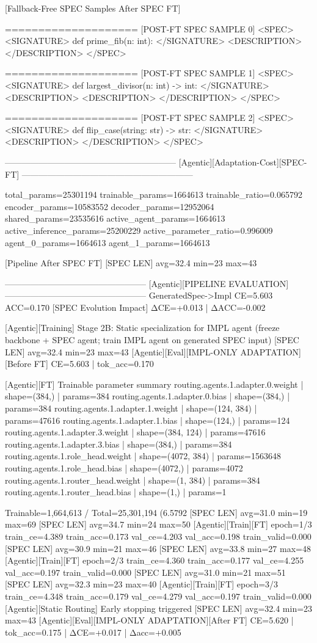 [Fallback-Free SPEC Samples After SPEC FT]

====================
[POST-FT SPEC SAMPLE 0]
<SPEC> <SIGNATURE> def prime_fib(n: int): </SIGNATURE> <DESCRIPTION> </DESCRIPTION> </SPEC>

====================
[POST-FT SPEC SAMPLE 1]
<SPEC> <SIGNATURE> def largest_divisor(n: int) -> int: </SIGNATURE> <DESCRIPTION> <DESCRIPTION> </DESCRIPTION> </SPEC>

====================
[POST-FT SPEC SAMPLE 2]
<SPEC> <SIGNATURE> def flip_case(string: str) -> str: </SIGNATURE> <DESCRIPTION> </DESCRIPTION> </SPEC>

------------------------------------------------------------
[Agentic][Adaptation-Cost][SPEC-FT]
------------------------------------------------------------

total_params=25301194
trainable_params=1664613
trainable_ratio=0.065792
encoder_params=10583552
decoder_params=12952064
shared_params=23535616
active_agent_params=1664613
active_inference_params=25200229
active_parameter_ratio=0.996009
agent_0_params=1664613
agent_1_params=1664613

[Pipeline After SPEC FT]
[SPEC LEN] avg=32.4 min=23 max=43

--------------------------------------------------
[Agentic][PIPELINE EVALUATION]
--------------------------------------------------
GeneratedSpec->Impl  CE=5.603 ACC=0.170
[SPEC Evolution Impact] ΔCE=+0.013 | ΔACC=-0.002

[Agentic][Training] Stage 2B: Static specialization for IMPL agent (freeze backbone + SPEC agent; train IMPL agent on generated SPEC input)
[SPEC LEN] avg=32.4 min=23 max=43
[Agentic][Eval][IMPL-ONLY ADAPTATION][Before FT] CE=5.603 | tok_acc=0.170

[Agentic][FT] Trainable parameter summary
routing.agents.1.adapter.0.weight | shape=(384,) | params=384
routing.agents.1.adapter.0.bias | shape=(384,) | params=384
routing.agents.1.adapter.1.weight | shape=(124, 384) | params=47616
routing.agents.1.adapter.1.bias | shape=(124,) | params=124
routing.agents.1.adapter.3.weight | shape=(384, 124) | params=47616
routing.agents.1.adapter.3.bias | shape=(384,) | params=384
routing.agents.1.role_head.weight | shape=(4072, 384) | params=1563648
routing.agents.1.role_head.bias | shape=(4072,) | params=4072
routing.agents.1.router_head.weight | shape=(1, 384) | params=384
routing.agents.1.router_head.bias | shape=(1,) | params=1

Trainable=1,664,613 / Total=25,301,194 (6.5792%
[SPEC LEN] avg=31.0 min=19 max=69
[SPEC LEN] avg=34.7 min=24 max=50
[Agentic][Train][FT] epoch=1/3 train_ce=4.389 train_acc=0.173 val_ce=4.203 val_acc=0.198 train_valid=0.000
[SPEC LEN] avg=30.9 min=21 max=46
[SPEC LEN] avg=33.8 min=27 max=48
[Agentic][Train][FT] epoch=2/3 train_ce=4.360 train_acc=0.177 val_ce=4.255 val_acc=0.197 train_valid=0.000
[SPEC LEN] avg=31.0 min=21 max=51
[SPEC LEN] avg=32.3 min=23 max=40
[Agentic][Train][FT] epoch=3/3 train_ce=4.348 train_acc=0.179 val_ce=4.279 val_acc=0.197 train_valid=0.000
[Agentic][Static Routing] Early stopping triggered
[SPEC LEN] avg=32.4 min=23 max=43
[Agentic][Eval][IMPL-ONLY ADAPTATION][After FT] CE=5.620 | tok_acc=0.175 | ΔCE=+0.017 | Δacc=+0.005

